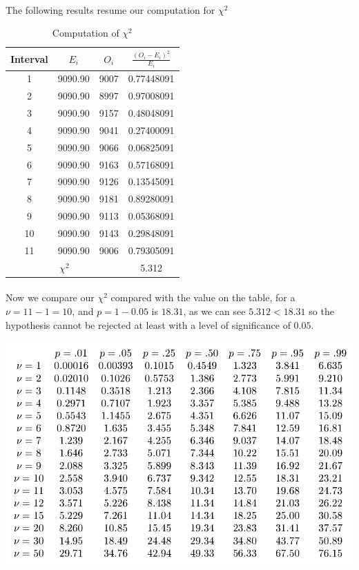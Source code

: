 \documentclass{article}
\begin{document}
\paragraph{} The following results resume our computation for $\chi^2$
\begin{table}[h!]
	\begin{center}
		\begin{tabular}{|c|c|c|c|}
			\hline
			\textbf{Interval} & \textbf{$E_i$} & \textbf{$O_i$} & $\frac{(O_i - E_i)^2}{E_i}$\\
			\hline
			1 & 9090.90 & 9007 & 0.77448091\\
			2 & 9090.90 & 8997 & 0.97008091\\
			3 & 9090.90 & 9157 & 0.48048091\\
			4 & 9090.90 & 9041 & 0.27400091\\
			5 & 9090.90 & 9066 & 0.06825091\\
			6 & 9090.90 & 9163 & 0.57168091\\
			7 & 9090.90 & 9126 & 0.13545091\\
			8 & 9090.90 & 9181 & 0.89280091\\
			9 & 9090.90 & 9113 & 0.05368091\\
			10 & 9090.90 & 9143 & 0.29848091\\
			11 & 9090.90 & 9006 & 0.79305091\\
			\hline
			\multicolumn{3}{|c|}{$\chi^2$} & 5.312\\
			\hline
		\end{tabular}
		\caption{Computation of $\chi^2$}
	\end{center}
\end{table}
\paragraph{}Now we compare our $\chi^2$ compared with  the value on the table, for a $\nu = 11 - 1 = 10$, and $p = 1 - 0.05$ is $18.31$, as we can see $5.312 < 18.31$ so the hypothesis cannot be rejected at least with a level of significance of $0.05.$
\begin{center}
	\includegraphics[width=0.7\linewidth]{chi_table.png}
\end{center}
\end{document}
